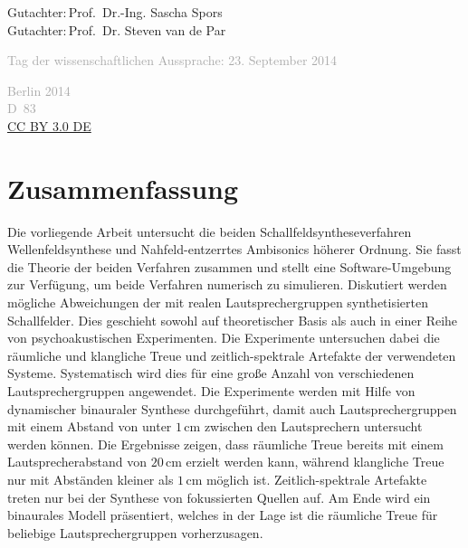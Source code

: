 \begin{titlepage}
\begin{fullwidth}
{        Gutachter:\;\;\;\;\:\,Prof.~Dr.-Ing. Sascha Spors\\
        Gutachter:\;\;\;\;\:\,Prof.~Dr. Steven van de Par\\
        }%
        \vspace{0.5cm}
        \fontsize{18}{20}\selectfont\par\noindent\textcolor{darkgray}{%
        Tag der wissenschaftlichen Aussprache: 23. September 2014
        }%
        \vspace{0.9cm}
        \fontsize{18}{20}\selectfont\par\noindent\textcolor{darkgray}{\centering%
        Berlin 2014\\
        D~83\\
        \href{https://creativecommons.org/licenses/by/3.0/de/}{%
        CC BY 3.0 DE}\\
        }%
    \end{fullwidth}%
\end{titlepage}

\chapter*{Zusammenfassung}

Die vorliegende Arbeit untersucht die beiden Schall\-feld\-syn\-the\-se\-ver\-fah\-ren
Wellenfeldsynthese und Nahfeld-entzerrtes Am\-bi\-so\-nics hö\-he\-rer Ordnung. Sie fasst
die Theorie der beiden Verfahren zusammen und stellt eine Software-Umgebung zur
Verfügung, um beide Verfahren numerisch zu simulieren.
Diskutiert werden mögliche Abweichungen der mit realen Lautsprechergruppen
synthetisierten Schallfelder. Dies geschieht sowohl auf theoretischer Basis
als auch in einer Reihe von psychoakustischen Experimenten. Die Experimente
untersuchen dabei die räumliche und klangliche Treue und zeitlich-spektrale
Artefakte der verwendeten Systeme. Systematisch wird dies für eine große
Anzahl von verschiedenen Lautsprechergruppen angewendet. Die Experimente werden mit Hilfe
von dynamischer binauraler Synthese durchgeführt, damit auch
Laut\-spre\-cher\-grup\-pen
mit einem Abstand von unter $1$\,cm zwischen den Lautsprechern
untersucht werden können.
Die Ergebnisse zeigen, dass räumliche Treue bereits mit einem
Lautsprecherabstand von $20$\,cm erzielt werden kann, während klangliche Treue
nur mit Abständen kleiner als $1$\,cm möglich ist.
Zeitlich-spektrale Artefakte treten nur bei der Synthese von fo\-kus\-sier\-ten
Quellen auf.
Am Ende wird ein binaurales Modell präsentiert, wel\-ches in der Lage ist die
räumliche Treue für beliebige Lautsprechergruppen vorherzusagen.

